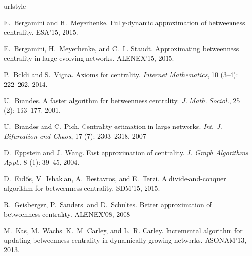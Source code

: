 \documentclass[11pt]{article}
\begin{document}
\setlength{\bibsep}{0pt}
\begin{thebibliography}{22}
\providecommand{\natexlab}[1]{#1}
\providecommand{\url}[1]{\texttt{#1}}
\expandafter\ifx\csname urlstyle\endcsname\relax
  \providecommand{\doi}[1]{doi: #1}\else
  \providecommand{\doi}{doi: \begingroup \urlstyle{rm}\Url}\fi

E.~Bergamini and H.~Meyerhenke.
\newblock Fully-dynamic approximation of betweenness centrality.
\newblock ESA'15, 2015.

E.~Bergamini, H.~Meyerhenke, and C.~L. Staudt.
\newblock Approximating betweenness centrality in large evolving networks.
\newblock ALENEX'15, 2015.

P.~Boldi and S.~Vigna.
\newblock Axioms for centrality.
\newblock \emph{Internet Mathematics}, 10 (3--4): 222--262,
  2014.

U.~Brandes.
\newblock A faster algorithm for betweenness centrality.
\newblock \emph{J. Math. Sociol.}, 25 (2): 163--177, 2001.

U.~Brandes and C.~Pich.
\newblock Centrality estimation in large networks.
\newblock \emph{Int. J. Bifurcation and Chaos}, 17 (7):
  2303--2318, 2007.

D.~Eppstein and J.~Wang.
\newblock Fast approximation of centrality.
\newblock \emph{J. Graph Algorithms Appl.}, 8 (1): 39--45,
  2004.

D.~Erd\H{o}s, V.~Ishakian, A.~Bestavros, and E.~Terzi.
\newblock A divide-and-conquer algorithm for betweenness centrality.
\newblock SDM'15, 2015.

R.~Geisberger, P.~Sanders, and D.~Schultes.
\newblock Better approximation of betweenness centrality.
\newblock ALENEX'08, 2008

M.~Kas, M.~Wachs, K.~M. Carley, and L.~R. Carley.
\newblock Incremental algorithm for updating betweenness centrality in
  dynamically growing networks.
\newblock ASONAM'13, 2013.


\end{thebibliography}
\end{document}
